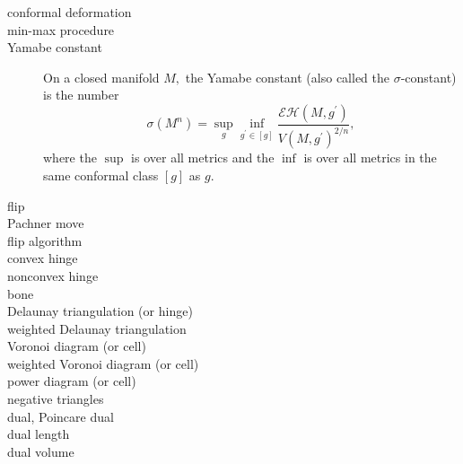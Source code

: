 \begin{description}
\item[conformal deformation] 

\item[min-max procedure] 

\item[Yamabe constant] On a closed manifold $M,$ the Yamabe constant (also
called the $\sigma $-constant) is the number 
\[
\sigma \left( M^{n}\right) =\sup_{g}\inf_{g^{\prime }\in \left[ g\right] }%
\frac{\mathcal{EH}\left( M,g^{\prime }\right) }{V\left( M,g^{\prime }\right)
^{2/n}}, 
\]%
where the $\sup $ is over all metrics and the $\inf $ is over all metrics in
the same conformal class $\left[ g\right] $ as $g.$

\item[flip] 

\item[Pachner move] 

\item[flip algorithm] 

\item[convex hinge] 

\item[nonconvex hinge] 

\item[bone] 

\item[Delaunay triangulation (or hinge)] 

\item[weighted Delaunay triangulation] 

\item[Voronoi diagram (or cell)] 

\item[weighted Voronoi diagram (or cell)] 

\item[power diagram (or cell)] 

\item[negative triangles] 

\item[dual, Poincare dual] 

\item[dual length] 

\item[dual volume] 
\end{description}
